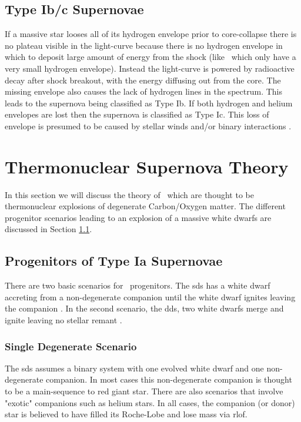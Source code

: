\subsection{Type Ib/c Supernovae}
If a massive star looses all of its hydrogen envelope prior to core-collapse there is no plateau visible in the light-curve because there is no hydrogen envelope in which to deposit large amount of energy from the shock (like \sneiil\ which only have a very small hydrogen envelope). Instead the light-curve is powered by radioactive decay after shock breakout, with the energy diffusing out from the core. The missing envelope also causes the lack of hydrogen lines in the spectrum. This leads to the supernova being classified as Type Ib. If both hydrogen and helium envelopes are lost then the supernova is classified as Type Ic. 
This loss of envelope is presumed to be caused by stellar winds and/or binary interactions \citep{1992ApJ...391..246P}. 


\section{Thermonuclear Supernova Theory}
In this section we will discuss the theory of \sneia\ which are thought to be thermonuclear explosions of degenerate Carbon/Oxygen matter. The different progenitor scenarios leading to an explosion of a massive white dwarfs are discussed in Section \ref{sec:snia_progenitor}.



\subsection{Progenitors of Type Ia Supernovae}
\label{sec:snia_progenitor}

There are two basic scenarios for \sneia\ progenitors. The \gls{sds} has a white dwarf accreting from a non-degenerate companion until the white dwarf ignites leaving the companion \citep[first introduced by][]{1973ApJ...186.1007W}. In the second scenario,  the \gls{dds}, two white dwarfs merge and ignite leaving no stellar remant \citep[first suggested by][]{1984ApJ...277..355W,1984ApJS...54..335I}. 

\subsubsection{Single Degenerate Scenario}
The \gls{sds} assumes a binary system with one evolved white dwarf and one non-degenerate companion. In most cases this non-degenerate companion is thought to be a main-sequence to red giant star. There are also scenarios that involve "exotic" companions such as helium stars. In all cases, the companion (or donor) star is believed to have filled its Roche-Lobe and lose mass via \gls{rlof}.

